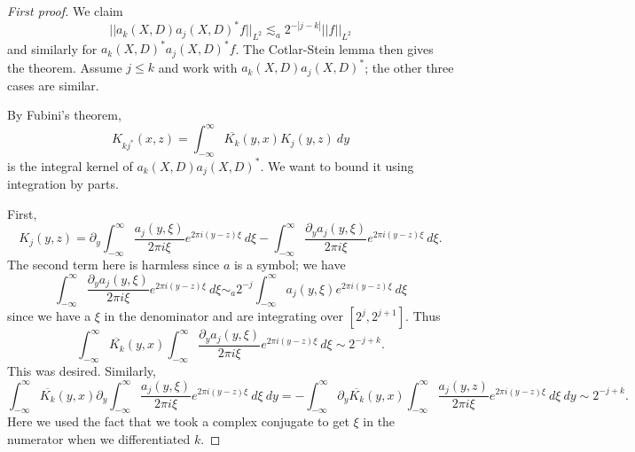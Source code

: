 \documentclass[12pt]{report}
\theoremstyle{definition}
\begin{document}
\begin{proof}[First proof]
We claim
$$||a_k(X, D) a_j(X, D)^* f||_{L^2} \lesssim_a 2^{-|j-k|}||f||_{L^2}$$
and similarly for $a_k(X, D)^* a_j(X, D)^* f$. The Cotlar-Stein lemma then gives the theorem.
Assume $j \leq k$ and work with $a_k(X, D) a_j(X, D)^*$; the other three cases are similar.

By Fubini's theorem,
$$K_{kj^*}(x, z)= \int_{-\infty}^\infty \overline{K_k}(y, x)K_j(y, z)~dy$$
is the integral kernel of $a_k(X, D) a_j(X, D)^*$.
We want to bound it using integration by parts.

First,
$$K_j(y, z) = \partial_y \int_{-\infty}^\infty \frac{a_j(y, \xi)}{2\pi i\xi} e^{2\pi i(y-z)\xi} ~d\xi - \int_{-\infty}^\infty \frac{\partial_ya_j(y,\xi)}{2\pi i\xi}e^{2\pi i(y-z)\xi}~d\xi.$$
The second term here is harmless since $a$ is a symbol; we have
$$\int_{-\infty}^\infty \frac{\partial_ya_j(y,\xi)}{2\pi i\xi}e^{2\pi i(y-z)\xi}~d\xi \sim_a 2^{-j}\int_{-\infty}^\infty a_j(y, \xi) e^{2\pi i(y-z)\xi} ~d\xi$$
since we have a $\xi$ in the denominator and are integrating over $[2^j, 2^{j+1}]$.
Thus
$$\int_{-\infty}^\infty \overline{K_k}(y, x) \int_{-\infty}^\infty \frac{\partial_ya_j(y,\xi)}{2\pi i\xi}e^{2\pi i(y-z)\xi}~d\xi \sim 2^{-j+k}.$$
This was desired. Similarly,
$$\int_{-\infty}^\infty \overline{K_k}(y, x)\partial_y \int_{-\infty}^\infty \frac{a_j(y, \xi)}{2\pi i\xi} e^{2\pi i(y-z)\xi} ~d\xi ~dy
= - \int_{-\infty}^\infty \partial_y \overline{K_k}(y, x) \int_{-\infty}^\infty \frac{a_j(y, z)}{2\pi i\xi} e^{2\pi i(y-z)\xi} ~d\xi ~dy \sim 2^{-j + k}.$$
Here we used the fact that we took a complex conjugate to get $\xi$ in the numerator when we differentiated $k$.
\end{proof}
\end{document}
